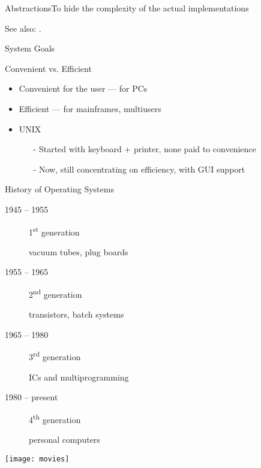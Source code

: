 \begin{frame}{Abstractions}{To hide the complexity of the actual implementations}
  \begin{center}
  \end{center}
\end{frame}

See also: .

\begin{frame}{System Goals}
  \begin{block}{Convenient vs. Efficient}
    \begin{itemize}
    \item Convenient for the user --- for PCs
    \item Efficient --- for mainframes, multiusers
    \item UNIX
      \begin{itemize}
      \item[-] Started with keyboard + printer, none paid to convenience
      \item[-] Now, still concentrating on efficiency, with GUI support
      \end{itemize}
    \end{itemize}
  \end{block}
\end{frame}

\begin{frame}{History of Operating Systems}
  \begin{center}
  \end{center}
\end{frame}

\begin{frame}
  \begin{minipage}{.4\linewidth}
    \begin{description}
    \item[1945 -- 1955] 1\textsuperscript{st} generation
    \item[] vacuum tubes, plug boards
    \item[1955 -- 1965] 2\textsuperscript{nd} generation
    \item[] transistors, batch systems
    \item[1965 -- 1980] 3\textsuperscript{rd} generation
    \item[] ICs and multiprogramming
    \item[1980 -- present] 4\textsuperscript{th} generation
    \item[] personal computers
    \end{description}
  \end{minipage}\;
  \begin{minipage}{.55\linewidth}
    \texttt{[image: movies]}
  \end{minipage}
  \end{frame}

